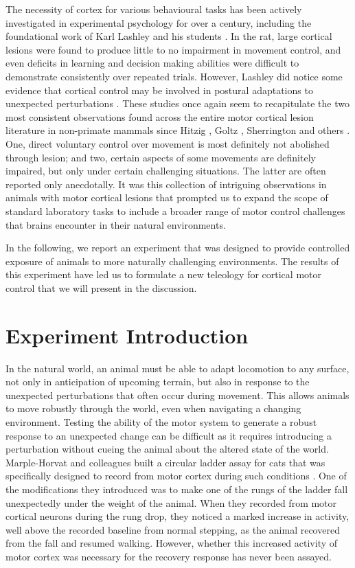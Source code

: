 The necessity of cortex for various behavioural tasks has been actively investigated in experimental psychology for over a century, including the foundational work of Karl Lashley and his students \cite{Lashley1921a,Lashley1950a}. In the rat, large cortical lesions were found to produce little to no impairment in movement control, and even deficits in learning and decision making abilities were difficult to demonstrate consistently over repeated trials. However, Lashley did notice some evidence that cortical control may be involved in postural adaptations to unexpected perturbations \cite{Lashley1921a}. These studies once again seem to recapitulate the two most consistent observations found across the entire motor cortical lesion literature in non-primate mammals since Hitzig \cite{Fritsch1870}, Goltz \cite{Goltz1888}, Sherrington \cite{Sherrington1885} and others \cite{Oakley1979,Terry1989}. One, direct voluntary control over movement is most definitely not abolished through lesion; and two, certain aspects of some movements are definitely impaired, but only under certain challenging situations. The latter are often reported only anecdotally. It was this collection of intriguing observations in animals with motor cortical lesions that prompted us to expand the scope of standard laboratory tasks to include a broader range of motor control challenges that brains encounter in their natural environments.

In the following, we report an experiment that was designed to provide controlled exposure of animals to more naturally challenging environments. The results of this experiment have led us to formulate a new teleology for cortical motor control that we will present in the discussion.

\section{Experiment Introduction}

In the natural world, an animal must be able to adapt locomotion to any surface, not only in anticipation of upcoming terrain, but also in response to the unexpected perturbations that often occur during movement. This allows animals to move robustly through the world, even when navigating a changing environment. Testing the ability of the motor system to generate a robust response to an unexpected change can be difficult as it requires introducing a perturbation without cueing the animal about the altered state of the world. Marple-Horvat and colleagues built a circular ladder assay for cats that was specifically designed to record from motor cortex during such conditions \cite{Marple-Horvat1993}. One of the modifications they introduced was to make one of the rungs of the ladder fall unexpectedly under the weight of the animal. When they recorded from motor cortical neurons during the rung drop, they noticed a marked increase in activity, well above the recorded baseline from normal stepping, as the animal recovered from the fall and resumed walking. However, whether this increased activity of motor cortex was necessary for the recovery response has never been assayed.
